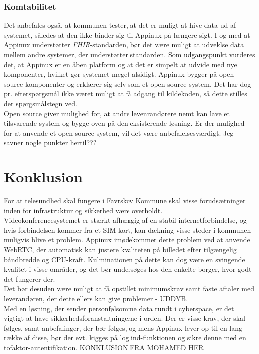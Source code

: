\subsubsection{Komtabilitet}
Det anbefales også, at kommunen tester, at det er muligt at hive data ud af systemet, således at den ikke binder sig til Appinux på længere sigt. I og med at Appinux understøtter \textit{FHIR}-standarden, bør det være muligt at udveklse data mellem andre systemer, der understøtter standarden. Som udgangspunkt vurderes det, at Appinux er en åben platform og at det er simpelt at udvide med nye komponenter, hvilket gør systemet meget alsidigt. Appinux bygger på open source-komponenter og erklærer sig selv som et open source-system. Det har dog pr. efterspørgsmål ikke været muligt at få adgang til kildekoden, så dette stilles der spørgsmålstegn ved.\\Open source giver mulighed for, at andre levenrandørere nemt kan lave et tilsvarende system og bygge oven på den eksisterende løsning. Er der mulighed for at anvende et open source-system, vil det være anbefalelsesværdigt.
Jeg savner nogle punkter hertil???
\section{Konklusion}
For at telesundhed skal fungere i Favrskov Kommune skal visse forudsætninger inden for infrastruktur og sikkerhed være overholdt.\\
Videokonferencesystemet er stærkt afhængig af en stabil internetforbindelse, og hvis forbindelsen kommer fra et SIM-kort, kan dækning visse steder i kommunen muligvis blive et problem. Appinux imødekommer dette problem ved at anvende WebRTC, der automatisk kan justere kvaliteten på billedet efter tilgængelig båndbredde og CPU-kraft. Kulminationen på dette kan dog være en svingende kvalitet i visse områder, og det bør undersøges hos den enkelte borger, hvor godt det fungerer der.\\
Det bør desuden være muligt at få opstillet minimumskrav samt faste aftaler med leverandøren, der dette ellers kan give problemer - UDDYB.\\
Med en løsning, der sender personfølsomme data rundt i cyberspace, er det vigtigt at have sikkerhedsforanstaltningerne i orden. Der er visse krav, der skal følges, samt anbefalinger, der bør følges, og mens Appinux lever op til en lang række af disse, bør der evt. kigges på log ind-funktionen og sikre denne med en tofaktor-autentifikation.
KONKLUSION FRA MOHAMED HER